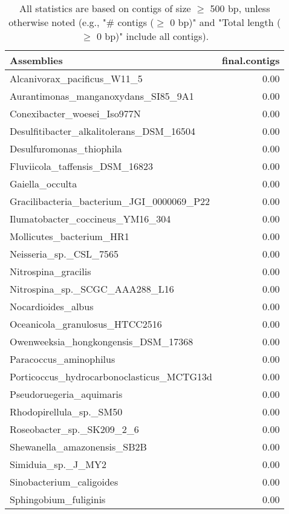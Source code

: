 \documentclass[12pt,a4paper]{article}
\begin{document}
\begin{table}[ht]
\begin{center}
\caption{All statistics are based on contigs of size $\geq$ 500 bp, unless otherwise noted (e.g., "\# contigs ($\geq$ 0 bp)" and "Total length ($\geq$ 0 bp)" include all contigs).}
\begin{tabular}{|l*{1}{|r}|}
\hline
Assemblies & final.contigs \\ \hline
Alcanivorax\_pacificus\_W11\_5 & 0.00 \\ \hline
Aurantimonas\_manganoxydans\_SI85\_9A1 & 0.00 \\ \hline
Conexibacter\_woesei\_Iso977N & 0.00 \\ \hline
Desulfitibacter\_alkalitolerans\_DSM\_16504 & 0.00 \\ \hline
Desulfuromonas\_thiophila & 0.00 \\ \hline
Fluviicola\_taffensis\_DSM\_16823 & 0.00 \\ \hline
Gaiella\_occulta & 0.00 \\ \hline
Gracilibacteria\_bacterium\_JGI\_0000069\_P22 & 0.00 \\ \hline
Ilumatobacter\_coccineus\_YM16\_304 & 0.00 \\ \hline
Mollicutes\_bacterium\_HR1 & 0.00 \\ \hline
Neisseria\_sp.\_CSL\_7565 & 0.00 \\ \hline
Nitrospina\_gracilis & 0.00 \\ \hline
Nitrospina\_sp.\_SCGC\_AAA288\_L16 & 0.00 \\ \hline
Nocardioides\_albus & 0.00 \\ \hline
Oceanicola\_granulosus\_HTCC2516 & 0.00 \\ \hline
Owenweeksia\_hongkongensis\_DSM\_17368 & 0.00 \\ \hline
Paracoccus\_aminophilus & 0.00 \\ \hline
Porticoccus\_hydrocarbonoclasticus\_MCTG13d & 0.00 \\ \hline
Pseudoruegeria\_aquimaris & 0.00 \\ \hline
Rhodopirellula\_sp.\_SM50 & 0.00 \\ \hline
Roseobacter\_sp.\_SK209\_2\_6 & 0.00 \\ \hline
Shewanella\_amazonensis\_SB2B & 0.00 \\ \hline
Simiduia\_sp.\_J\_MY2 & 0.00 \\ \hline
Sinobacterium\_caligoides & 0.00 \\ \hline
Sphingobium\_fuliginis & 0.00 \\ \hline

\end{tabular}
\end{center}
\end{table}
\end{document}
